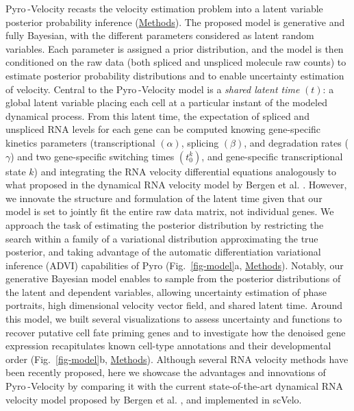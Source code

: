 \documentclass[
  sn-mathphys-num,
  lineno,
  twocolumn]{sn-jnl}
\begin{document}
Pyro -Velocity recasts the velocity estimation problem into a latent
variable posterior probability inference
(\hyperref[sec-methods]{Methods}). The proposed model is generative and
fully Bayesian, with the different parameters considered as latent
random variables. Each parameter is assigned a prior distribution, and
the model is then conditioned on the raw data (both spliced and
unspliced molecule raw counts) to estimate posterior probability
distributions and to enable uncertainty estimation of velocity. Central
to the Pyro -Velocity model is a \emph{shared latent time} \((t)\): a
global latent variable placing each cell at a particular instant of the
modeled dynamical process. From this latent time, the expectation of
spliced and unspliced RNA levels for each gene can be computed knowing
gene-specific kinetics parameters (transcriptional \((\alpha)\),
splicing \((\beta)\), and degradation rates (\(\gamma\)) and two
gene-specific switching times \((t_{0}^{k})\), and gene-specific
transcriptional state \(k\)) and integrating the RNA velocity
differential equations analogously to what proposed in the dynamical RNA
velocity model by Bergen et al. \citep{Bergen2020-pj, Li2021-qa}.
However, we innovate the structure and formulation of the latent time
given that our model is set to jointly fit the entire raw data matrix,
not individual genes. We approach the task of estimating the posterior
distribution by restricting the search within a family of a variational
distribution approximating the true posterior, and taking advantage of
the automatic differentiation variational inference (ADVI) capabilities
of Pyro \citep{Bingham2018-id, Kucukelbir2016-bk}
(Fig.~\ref{fig-model}a, \hyperref[sec-methods]{Methods}). Notably, our
generative Bayesian model enables to sample from the posterior
distributions of the latent and dependent variables, allowing
uncertainty estimation of phase portraits, high dimensional velocity
vector field, and shared latent time. Around this model, we built
several visualizations to assess uncertainty and functions to recover
putative cell fate priming genes and to investigate how the denoised
gene expression recapitulates known cell-type annotations and their
developmental order (Fig.~\ref{fig-model}b,
\hyperref[sec-methods]{Methods}). Although several RNA velocity methods
\citep{Gayoso2024-fz, Gorin2022-il, Gu2022-rh, Cui2022-em, Gao2022-jq}
have been recently proposed, here we showcase the advantages and
innovations of Pyro -Velocity by comparing it with the current
state-of-the-art dynamical RNA velocity model proposed by Bergen et al.
\citep{Bergen2020-pj}, and implemented in scVelo.
\end{document}
